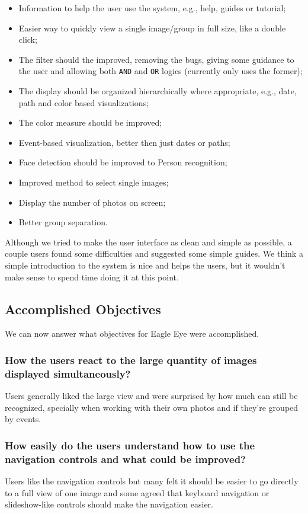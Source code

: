 \begin{itemize}
	\item Information to help the user use the system, e.g., help, guides or tutorial;
	\item Easier way to quickly view a single image/group in full size, like a double click;
	\item The filter should the improved, removing the bugs, giving some guidance to the user and allowing both \texttt{AND} and \texttt{OR} logics (currently only uses the former);
	\item The display should be organized hierarchically where appropriate, e.g., date, path and color based visualizations;
	\item The color measure should be improved;
	\item Event-based visualization, better then just dates or paths;
	\item Face detection should be improved to Person recognition;
	\item Improved method to select single images;
	\item Display the number of photos on screen;
	\item Better group separation.
\end{itemize}

Although we tried to make the user interface as clean and simple as possible, a couple users found some difficulties and suggested some simple guides. We think a simple introduction to the system is nice and helps the users, but it wouldn't make sense to spend time doing it at this point.


\subsection{Accomplished Objectives} 

We can now answer what objectives for Eagle Eye were accomplished. 

\subsubsection{How the users react to the large quantity of images displayed simultaneously?}
Users generally liked the large view and were surprised by how much can still be recognized, specially when working with their own photos and if they're grouped by events. 

\subsubsection{How easily do the users understand how to use the navigation controls and what could be improved?}
Users like the navigation controls but many felt it should be easier to go directly to a full view of one image and some agreed that keyboard navigation or slideshow-like controls should make the navigation easier.

